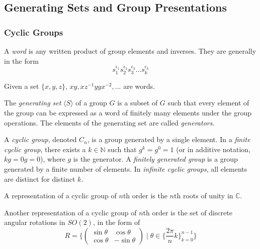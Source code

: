 \documentclass{article}
\begin{document}
  \subsection{Generating Sets and Group Presentations}

    \subsubsection{Cyclic Groups}

      \begin{definition}
        A \textit{word} is any written product of group elements and inverses. They are generally in the form
        \begin{equation}
          s_{1}^{\epsilon_{1}} s_{2}^{\epsilon_{2}} s_{3}^{\epsilon_{3}}... s_{k}^{\epsilon_{k}}
        \end{equation}
      \end{definition}

      \begin{example}
        Given a set $\{x,y,z\}$, $x y, x z^{-1} y y x^{-2},...$ are words. 
      \end{example}

      \begin{definition}
        The \textit{generating set} $\langle S \rangle$ of a group $G$ is a subset of $G$ such that every element of the group can be expressed as a word of finitely many elements under the group operations. The elements of the generating set are called \textit{generators}.
      \end{definition}

      \begin{definition}
        A \textit{cyclic group}, denoted $C_{n}$, is a group generated by a single element. In a \textit{finite cyclic group}, there exists a $k \in \mathbb{N}$ such that $g^{k} = g^{0} = 1$ (or in additive notation, $kg = 0g = 0$), where $g$ is the generator. A \textit{finitely generated group} is a group generated by a finite number of elements. In \textit{infinite cyclic groups}, all elements are distinct for distinct $k$. 
      \end{definition}

      \begin{example}
        A representation of a cyclic group of $n$th order is the $n$th roots of unity in $\mathbb{C}$.
      \end{example}

      \begin{example}
        Another representation of a cyclic group of $n$th order is the set of discrete angular rotations in $SO(2)$, in the form of 
        \begin{equation}
          R =  \bigg\{ \begin{pmatrix}
          \sin{\theta} & \cos{\theta} \\
          \cos{\theta} & -\sin{\theta}
          \end{pmatrix}\; \bigg| \; \theta \in \Big\{\frac{2 \pi}{n} k\Big\}_{k = 0}^{n-1} \bigg\}
        \end{equation}
      \end{example}
\end{document}
